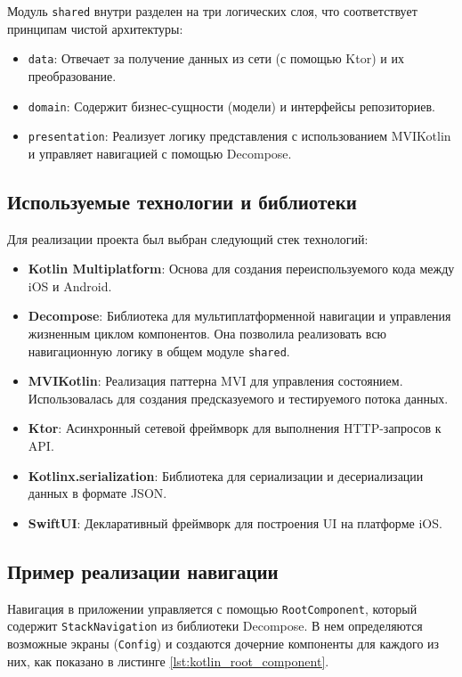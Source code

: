 \documentclass[14pt, russian]{scrartcl}
\begin{document}
Модуль \texttt{shared} внутри разделен на три логических слоя, что соответствует принципам чистой архитектуры:

\begin{itemize}
    \item \texttt{data}: Отвечает за получение данных из сети (с помощью Ktor) и их преобразование.
    \item \texttt{domain}: Содержит бизнес-сущности (модели) и интерфейсы репозиториев.
    \item \texttt{presentation}: Реализует логику представления с использованием MVIKotlin и управляет навигацией с помощью Decompose.
\end{itemize}

\subsection{Используемые технологии и библиотеки}

Для реализации проекта был выбран следующий стек технологий:

\begin{itemize}
    \item \textbf{Kotlin Multiplatform}: Основа для создания переиспользуемого кода между iOS и Android.
    \item \textbf{Decompose}: Библиотека для мультиплатформенной навигации и управления жизненным циклом компонентов. Она позволила реализовать всю навигационную логику в общем модуле \texttt{shared}.
    \item \textbf{MVIKotlin}: Реализация паттерна MVI для управления состоянием. Использовалась для создания предсказуемого и тестируемого потока данных.
    \item \textbf{Ktor}: Асинхронный сетевой фреймворк для выполнения HTTP-запросов к API.
    \item \textbf{Kotlinx.serialization}: Библиотека для сериализации и десериализации данных в формате JSON.
    \item \textbf{SwiftUI}: Декларативный фреймворк для построения UI на платформе iOS.
\end{itemize}

\subsection{Пример реализации навигации}

Навигация в приложении управляется с помощью \texttt{RootComponent}, который содержит \texttt{StackNavigation} из библиотеки Decompose. В нем определяются возможные экраны (\texttt{Config}) и создаются дочерние компоненты для каждого из них, как показано в листинге \ref{lst:kotlin_root_component}.
\end{document}
